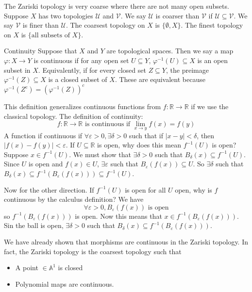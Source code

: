 \documentclass{report}
\begin{document}
The Zariski topology is very coarse where there are not many open subsets. Suppose $X$ has two topologies $\mathcal{U}$ and $\mathcal{V}$. We say $\mathcal{U}$ is coarser than $\mathcal{V}$ if $\mathcal{U} \subseteq \mathcal{V}$. We say $\mathcal{V}$ is finer than $\mathcal{U}$. The coarsest topology on $X$ is $\{\emptyset, X\}$. The finest topology on $X$ is $\{\text{all subsets of $X$}\}$.

\begin{definition}{Continuity}
    Suppose that $X$ and $Y$ are topological spaces. Then we say a map $\varphi : X \rightarrow Y$ is continuous if for any open set $U \subseteq Y$, $\varphi^{-1}(U) \subseteq X$ is an open subset in $X$. Equivalently, if for every closed set $Z \subseteq Y$, the preimage $\varphi^{-1}(Z) \subseteq X$ is a closed subset of $X$. These are equivalent because $\varphi^{-1}(Z^{c}) = (\varphi^{-1}(Z))^{c}$ 
\end{definition}

This definition generalizes continuous functions from $f : \mathbb{R} \rightarrow \mathbb{R}$ if we use the classical topology. The definition of continuity:
    \begin{equation*}
        f: \mathbb{R} \rightarrow \mathbb{R} \text{ is continuous if } \lim\limits_{x \to y} f(x) = f(y)
    \end{equation*}
A function if continuous if $\forall  \varepsilon > 0, \exists \delta > 0 $ such that if $\lvert x - y \rvert < \delta$, then $\lvert f(x) - f(y) \rvert < \varepsilon$. If $U \subseteq \mathbb{R}$ is open, why does this mean $f^{-1}(U)$ is open? Suppose $x \in f^{-1}(U)$. We must show that $\exists \delta > 0$ such that $B_{\delta}(x) \subseteq f^{-1}(U)$. Since $U$ is open and $f(x) \in U$, $\exists \varepsilon$ such that $B_{\varepsilon}(f(x)) \subseteq U$. So $\exists \delta$ such that $B_{\delta}(x) \subseteq f^{-1}(B_{\varepsilon}(f(x))) \subseteq f^{-1}(U)$.

Now for the other direction. If $f^{-1}(U)$ is open for all $U$ open, why is $f$ continuous by the calculus definition? We have
    \begin{equation*}
        \forall \varepsilon > 0, B_{\varepsilon}(f(x)) \text{ is open}
    \end{equation*}
so $f^{-1}(B_{\varepsilon}(f(x)))$ is open. Now this means that $x \in f^{-1}(B_{\varepsilon}(f(x)))$. Sin the ball is open, $\exists  \delta > 0$ such that $B_{\delta}(x) \subseteq f^{-1}(B_{\varepsilon}(f(x)))$.

We have already shown that morphisms are continuous in the Zariski topology. In fact, the Zariski topology is the coarsest topology such that
    \begin{itemize}
        \item A point $\in \mathbb{A}^{1}$ is closed

        \item Polynomial maps are continuous.
    \end{itemize}
\end{document}
